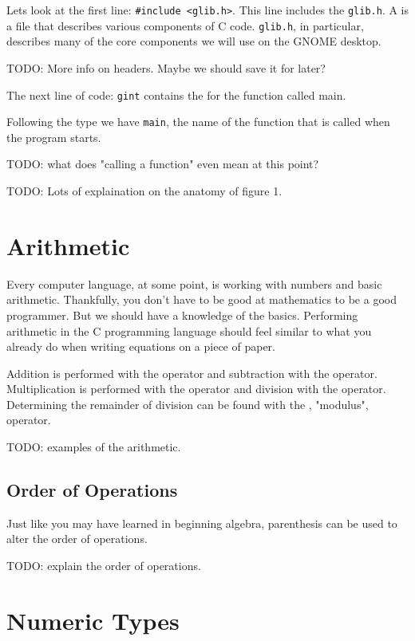 Lets look at the first line: \verb|#include <glib.h>|. This line includes
the  \verb|glib.h|. A  is a file that describes
various components of C code. \verb|glib.h|, in particular, describes many
of the core components we will use on the GNOME desktop.

TODO: More info on headers. Maybe we should save it for later?

The next line of code: \verb|gint| contains the  for the
function called main.

Following the type we have \verb|main|, the name of the function that is
called when the program starts.

TODO: what does "calling a function" even mean at this point?



TODO: Lots of explaination on the anatomy of figure 1.


\section{Arithmetic}

Every computer language, at some point, is working with numbers and basic
arithmetic. Thankfully, you don't have to be good at mathematics to be a good
programmer. But we should have a knowledge of the basics. Performing arithmetic
in the C programming language should feel similar to what you already do when
writing equations on a piece of paper.

Addition is performed with the \ident{+} operator and subtraction with the
\ident{-} operator. Multiplication is performed with the \ident{*} operator and
division with the \ident{/} operator. Determining the remainder of division can
be found with the \ident{\%}, "modulus", operator.

TODO: examples of the arithmetic.

\subsection{Order of Operations}

Just like you may have learned in beginning algebra, parenthesis can be used
to alter the order of operations.

TODO: explain the order of operations.

\section{Numeric Types}

